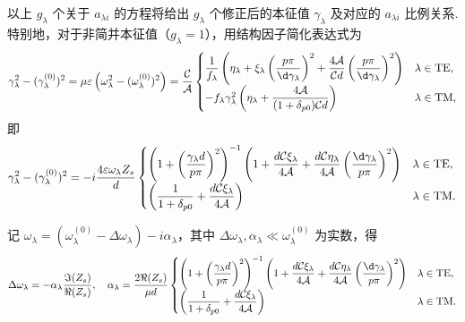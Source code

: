 以上 \(g_{\lambda}\) 个关于 \(a_{\lambda i}\) 的方程将给出 \(g_{\lambda}\) 个修正后的本征值 \(\gamma_{\lambda}\) 及对应的 \(a_{\lambda i}\) 比例关系.特别地，对于非简并本征值（\(g_{\lambda} = 1\)），用结构因子简化表达式为
\begin{equation*}
	\gamma_{\lambda}^2 - (\gamma_{\lambda}^{(0)})^2 = \mu\varepsilon \left( \omega_{\lambda}^2 - (\omega_{\lambda}^{(0)})^2 \right) = \dfrac{\mathcal{C}}{\mathcal{A}} \begin{cases}
		\dfrac{1}{f_{\lambda}} \left( \eta_{\lambda} + \xi_{\lambda} \left( \dfrac{p\pi}{\d \gamma_{\lambda}} \right)^2 + \dfrac{4\mathcal{A}}{\mathcal{C}d} \left( \dfrac{p\pi}{\d \gamma_{\lambda}} \right)^2 \right) & \lambda \in \text{TE}, \\
		-f_{\lambda} \gamma_{\lambda}^2 \left( \eta_{\lambda} + \dfrac{4\mathcal{A}}{(1+\delta_{p0})\mathcal{C}d} \right)                                                                                               & \lambda \in \text{TM},
	\end{cases}
\end{equation*}
即
\begin{equation*}
	\gamma_{\lambda}^2 - (\gamma_{\lambda}^{(0)})^2 = -i\dfrac{ 4 \varepsilon \omega_{\lambda} Z_s}{d} \begin{cases}
		\left( 1 + \left( \dfrac{\gamma_{\lambda} d}{p\pi} \right)^2 \right)^{-1} \left( 1 + \dfrac{d \mathcal{C} \xi_{\lambda}}{4\mathcal{A}} + \dfrac{d \mathcal{C} \eta_{\lambda}}{4\mathcal{A}} \left( \dfrac{\d \gamma_{\lambda}}{p\pi} \right)^2 \right) & \lambda \in \text{TE}, \\[9pt]
		\left( \dfrac{1}{1+\delta_{p0}} + \dfrac{d \mathcal{C} \xi_{\lambda}}{4\mathcal{A}} \right)                                                                                                                                                            & \lambda \in \text{TM}.
	\end{cases}
\end{equation*}

记 \(\omega_{\lambda} = (\omega_{\lambda}^{(0)} - \Delta\omega_{\lambda}) - i \alpha_{\lambda}\)，其中 \(\Delta\omega_{\lambda}, \alpha_{\lambda} \ll \omega_{\lambda}^{(0)}\) 为实数，得
\begin{equation*}
	\Delta\omega_{\lambda} = -\alpha_{\lambda} \frac{\Im(Z_s)}{\Re(Z_s)}, \quad \alpha_{\lambda} = \dfrac{2 \Re(Z_s)}{\mu d} \begin{cases}
		\left( 1 + \left( \dfrac{\gamma_{\lambda} d}{p\pi} \right)^2 \right)^{-1} \left( 1 + \dfrac{d \mathcal{C} \xi_{\lambda}}{4\mathcal{A}} + \dfrac{d \mathcal{C} \eta_{\lambda}}{4\mathcal{A}} \left( \dfrac{\d \gamma_{\lambda}}{p\pi} \right)^2 \right) & \lambda \in \text{TE}, \\[8pt]
		\left( \dfrac{1}{1+\delta_{p0}} + \dfrac{d \mathcal{C} \xi_{\lambda}}{4\mathcal{A}} \right)                                                                                                                                                            & \lambda \in \text{TM}.
	\end{cases}
\end{equation*}

